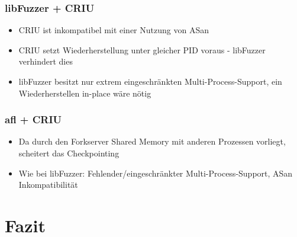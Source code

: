 \documentclass[handout]{beamer}
\begin{document}
\begin{frame}
    \frametitle{libFuzzer + CRIU}
    \begin{itemize}
        \item CRIU ist inkompatibel mit einer Nutzung von ASan
        \item CRIU setzt Wiederherstellung unter gleicher PID voraus - libFuzzer verhindert dies
        \item libFuzzer besitzt nur extrem eingeschränkten Multi-Process-Support, ein Wiederherstellen in-place wäre nötig
    \end{itemize}
\end{frame}

\begin{frame}
    \frametitle{afl + CRIU}
    \begin{itemize}
        \item Da durch den Forkserver Shared Memory mit anderen Prozessen vorliegt, scheitert das Checkpointing
        \item Wie bei libFuzzer: Fehlender/eingeschränkter Multi-Process-Support, ASan Inkompatibilität
    \end{itemize}
\end{frame}

\section{Fazit}
\end{document}
